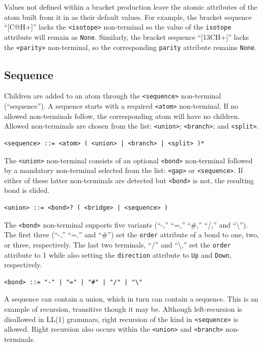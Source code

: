 \documentclass{article}
\def\ttt{\texttt}
\begin{document}
Values not defined within a bracket production leave the atomic attributes of the atom built from it in as their default values. For example, the bracket sequence \enquote{[C@H+]} lacks the \ttt{<isotope>} non-terminal so the value of the \ttt{isotope} attribute will remain as \ttt{None}. Similarly, the bracket sequence \enquote{[13CH+]} lacks the \ttt{<parity>} non-terminal, so the corresponding \ttt{parity} attribute remains \ttt{None}.

\subsection*{Sequence}

Children are added to an atom through the \ttt{<sequence>} non-terminal (\enquote{sequence}). A sequence starts with a required \ttt{<atom>} non-terminal. If no allowed non-terminals follow, the corresponding atom will have no children. Allowed non-terminals are chosen from the list: \ttt{<union>}; \ttt{<branch>}; and \ttt{<split>}.

\begin{lstlisting}
<sequence> ::= <atom> ( <union> | <branch> | <split> )*
\end{lstlisting}

The \ttt{<union>} non-terminal consists of an optional \ttt{<bond>} non-terminal followed by a mandatory non-terminal selected from the list: \ttt{<gap>} or \ttt{<sequence>}. If either of these latter non-terminals are detected but \ttt{<bond>} is not, the resulting bond is elided.

\begin{lstlisting}
<union> ::= <bond>? ( <bridge> | <sequence> )
\end{lstlisting}

The \ttt{<bond>} non-terminal supports five variants (\enquote{-,} \enquote{=,} \enquote{\#,} \enquote{/,} and \enquote{\textbackslash}). The first three (\enquote{-,} \enquote{=,} and \enquote{\#}) set the \ttt{order} attribute of a bond to one, two, or three, respectively. The last two terminals, \enquote{/} and \enquote{\textbackslash,} set the \ttt{order} attribute to 1 while also setting the \ttt{direction} attribute to \ttt{Up} and \ttt{Down}, respectively.

\begin{lstlisting}
<bond> ::= "-" | "=" | "#" | "/" | "\"
\end{lstlisting}

A sequence can contain a union, which in turn can contain a sequence. This is an example of recursion, transitive though it may be. Although left-recursion is disallowed in LL(1) grammars, right recursion of the kind in \ttt{<sequence>} is allowed. Right recursion also occurs within the \ttt{<union>} and \ttt{<branch>} non-terminals.
\end{document}
